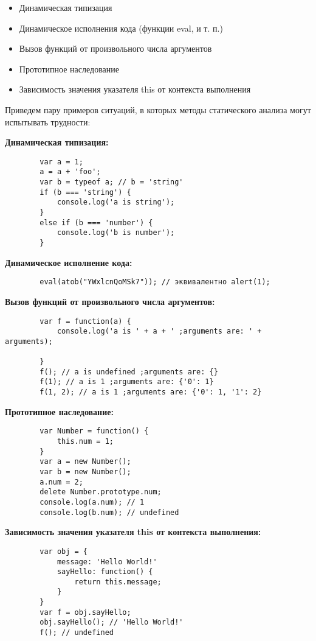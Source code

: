 	\begin{itemize}
		\item Динамическая типизация
		\item Динамическое исполнения кода (функции eval, и т. п.)
		\item Вызов функций от произвольного числа аргументов
		\item Прототипное наследование
		\item Зависимость значения указателя this от контекста выполнения
	\end{itemize}
	\bigskip

	Приведем пару примеров ситуаций, в которых методы статического анализа могут испытывать трудности:


	\bigskip
	\textbf{Динамическая типизация:}
	\begin{lstlisting}
		var a = 1;
		a = a + 'foo';
		var b = typeof a; // b = 'string'
		if (b === 'string') {
			console.log('a is string');
		}
		else if (b === 'number') {
			console.log('b is number');
		}
	\end{lstlisting}

	\bigskip
	\textbf{Динамическое исполнение кода:}
	\begin{lstlisting}
		eval(atob("YWxlcnQoMSk7")); // эквивалентно alert(1);
	\end{lstlisting}

	\bigskip
	\textbf{Вызов функций от произвольного числа аргументов:}
	\begin{lstlisting}
		var f = function(a) {
			console.log('a is ' + a + ' ;arguments are: ' + arguments);
			
		}
		f(); // a is undefined ;arguments are: {}
		f(1); // a is 1 ;arguments are: {'0': 1}
		f(1, 2); // a is 1 ;arguments are: {'0': 1, '1': 2}
	\end{lstlisting}		

	\bigskip
	\textbf{Прототипное наследование:}
	\begin{lstlisting}
		var Number = function() {
			this.num = 1;
		}
		var a = new Number();
		var b = new Number();
		a.num = 2;
		delete Number.prototype.num;
		console.log(a.num); // 1
		console.log(b.num); // undefined
	\end{lstlisting}	

	\bigskip
	\textbf{Зависимость значения указателя this от контекста выполнения:}
	\begin{lstlisting}
		var obj = {
			message: 'Hello World!'
			sayHello: function() {
				return this.message;
			}
		}
		var f = obj.sayHello;
		obj.sayHello(); // 'Hello World!'
		f(); // undefined
	\end{lstlisting}	


